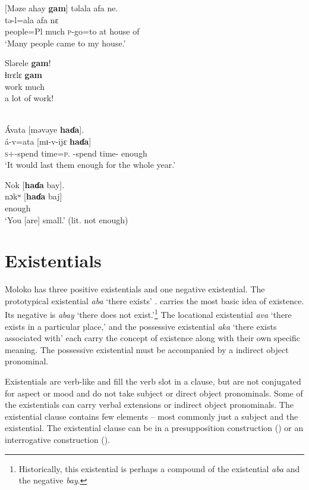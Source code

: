 \ea \label{ex:3:81}
[Məze  ahay  \textbf{gam}]  təlala  afa  ne.\\
\gll  [mɪʒɛ=ahaj  \textbf{gam}]  tə-l=ala    afa    nɛ\\
      people=Pl  much  \textsc{p}-go=to  {at house of}  {\oneS}\\
\glt  ‘Many people came to my house.’
\z

\ea \label{ex:3:82}
 Slərele  \textbf{gam}!\\
\gll  ɬɪrɛlɛ   \textbf{gam}\\
      work  much\\
\glt  [That is] a lot of work!
\z

\ea\label{ex:3:83}\\
Ávata  [məvəye  \textbf{haɗa}].\\
\gll  á-v=ata    [mɪ-v-ijɛ     \textbf{haɗa}]\\
      \textsc{s}+{\IFV}-{spend time}=\textsc{p}.{\IO}   {\NOM}{}-{spend time}-{\CL}     enough\\
\glt  ‘It would last them enough for the whole year.’  
\z

\ea \label{ex:3:84}
Nok [\textbf{haɗa}  bay].\\
\gll  nɔkʷ  [\textbf{haɗa}   baj]\\
      {\twoS}    enough  {\NEG}\\
\glt  ‘You [are] small.’ (lit. not enough)
\z
{}
\section{Existentials}\label{sec:3.4}
\hypertarget{RefHeading1211121525720847}{}
Moloko has three positive existentials and one negative existential. The prototypical existential \textit{aba} ‘there exists’ . carries the most basic idea of existence. Its negative is \textit{abay} ‘there does not exist.’\footnote{Historically, this existential is perhaps a compound of the existential \textit{aba} and the negative \textit{bay}.} The locational existential \textit{ava} ‘there exists in a particular place,’ and the possessive existential \textit{aka} ‘there exists associated with’ each carry the concept of existence along with their own specific meaning. The possessive existential must be accompanied by a indirect object pronominal.  

Existentials are verb-like and fill the verb slot in a clause, but are not conjugated for aspect or mood and do not take subject or direct object pronominals. Some of the existentials can carry verbal extensions or indirect object pronominals. The existential clause contains few elements -- most commonly just a subject and the existential. The existential clause can be in a presupposition construction () or an interrogative construction (). 

